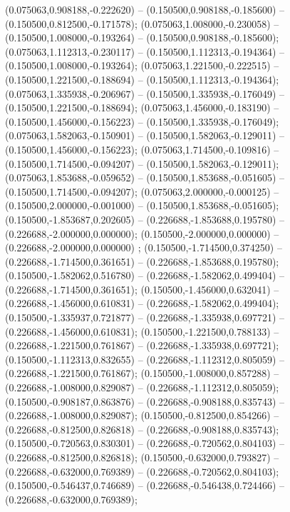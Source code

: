  (0.075063,0.908188,-0.222620) -- (0.150500,0.908188,-0.185600) -- (0.150500,0.812500,-0.171578);
 (0.075063,1.008000,-0.230058) -- (0.150500,1.008000,-0.193264) -- (0.150500,0.908188,-0.185600);
 (0.075063,1.112313,-0.230117) -- (0.150500,1.112313,-0.194364) -- (0.150500,1.008000,-0.193264);
 (0.075063,1.221500,-0.222515) -- (0.150500,1.221500,-0.188694) -- (0.150500,1.112313,-0.194364);
 (0.075063,1.335938,-0.206967) -- (0.150500,1.335938,-0.176049) -- (0.150500,1.221500,-0.188694);
 (0.075063,1.456000,-0.183190) -- (0.150500,1.456000,-0.156223) -- (0.150500,1.335938,-0.176049);
 (0.075063,1.582063,-0.150901) -- (0.150500,1.582063,-0.129011) -- (0.150500,1.456000,-0.156223);
 (0.075063,1.714500,-0.109816) -- (0.150500,1.714500,-0.094207) -- (0.150500,1.582063,-0.129011);
 (0.075063,1.853688,-0.059652) -- (0.150500,1.853688,-0.051605) -- (0.150500,1.714500,-0.094207);
 (0.075063,2.000000,-0.000125) -- (0.150500,2.000000,-0.001000) -- (0.150500,1.853688,-0.051605);
 (0.150500,-1.853687,0.202605) -- (0.226688,-1.853688,0.195780) -- (0.226688,-2.000000,0.000000);
 (0.150500,-2.000000,0.000000) -- (0.226688,-2.000000,0.000000) ;
 (0.150500,-1.714500,0.374250) -- (0.226688,-1.714500,0.361651) -- (0.226688,-1.853688,0.195780);
 (0.150500,-1.582062,0.516780) -- (0.226688,-1.582062,0.499404) -- (0.226688,-1.714500,0.361651);
 (0.150500,-1.456000,0.632041) -- (0.226688,-1.456000,0.610831) -- (0.226688,-1.582062,0.499404);
 (0.150500,-1.335937,0.721877) -- (0.226688,-1.335938,0.697721) -- (0.226688,-1.456000,0.610831);
 (0.150500,-1.221500,0.788133) -- (0.226688,-1.221500,0.761867) -- (0.226688,-1.335938,0.697721);
 (0.150500,-1.112313,0.832655) -- (0.226688,-1.112312,0.805059) -- (0.226688,-1.221500,0.761867);
 (0.150500,-1.008000,0.857288) -- (0.226688,-1.008000,0.829087) -- (0.226688,-1.112312,0.805059);
 (0.150500,-0.908187,0.863876) -- (0.226688,-0.908188,0.835743) -- (0.226688,-1.008000,0.829087);
 (0.150500,-0.812500,0.854266) -- (0.226688,-0.812500,0.826818) -- (0.226688,-0.908188,0.835743);
 (0.150500,-0.720563,0.830301) -- (0.226688,-0.720562,0.804103) -- (0.226688,-0.812500,0.826818);
 (0.150500,-0.632000,0.793827) -- (0.226688,-0.632000,0.769389) -- (0.226688,-0.720562,0.804103);
 (0.150500,-0.546437,0.746689) -- (0.226688,-0.546438,0.724466) -- (0.226688,-0.632000,0.769389);

